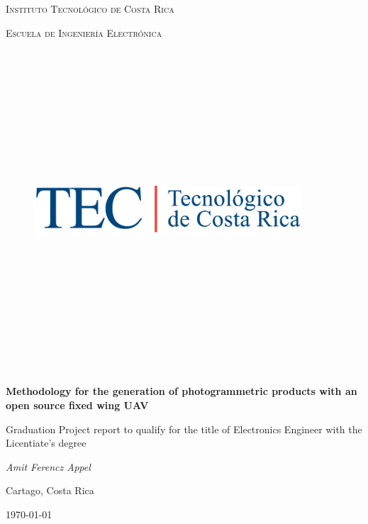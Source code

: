 \begin{titlepage}
	\centering
	{\scshape\LARGE Instituto Tecnológico de Costa Rica \par}
	\vspace{1cm}
    {\scshape\Large Escuela de Ingeniería Electrónica \par}
    \vspace{1cm}
    
    \begin{figure}[hb]
	\centering
	\includegraphics[width=10cm,height=12cm,keepaspectratio]{imagenes/tec.png}
	\end{figure}
    
	\vspace{1cm}
	{\LARGE\bfseries Methodology for the generation of photogrammetric products with an open source fixed wing UAV\par}
	\vspace{1cm}
    {\LARGE Graduation Project report to qualify for the title of Electronics Engineer with the Licentiate's degree
\par}
    \vspace{1cm}
    {\LARGE\itshape Amit Ferencz Appel\par}
    \vfill
	{\Large Cartago, Costa Rica\par}

	{\large \today\par}
\end{titlepage}